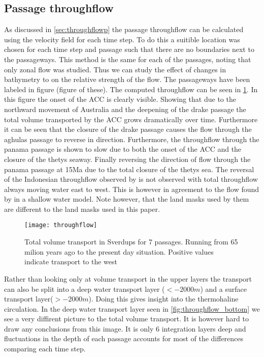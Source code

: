 \subsection{Passage throughflow} \label{sec:throughflow}
As discussed in \cref{sec:throughflowp} the passage throughflow can be calculated using the velocity field for each time step. To do this a suitible location was chosen for each time step and passage such that there are no boundaries next to the passageways. This method is the same for each of the passages, noting that only zonal flow was studied. Thus we can study the effect of changes in bathymetry to on the relative strength of the flow.  The passageways have been labeled in figure (figure of these). The computed throughflow can be seen in \cref{fig:throughflow}. In this figure the onset of the ACC is clearly visible. Showing that due to the northward movement of Australia and the deepening of the drake passage the total volume transported by the ACC grows dramatically over time. Furthermore it can be seen that the closure of the drake passage causes the flow through the aghulas passage to reverse in direction. Furthermore, the throughflow through the panama passage is shown to slow due to both the onset of the ACC and the closure of the thetys seaway. Finally reversing the direction of flow through the panama passage at 15Ma due to the total closure of the thetys sea. The reversal of the Indonesian throughflow observed by \cite{Mulder2017Jul} is not observed with total throughflow always moving water east to west. This is however in agreement to the flow found by \cite{omta2003physical} in a shallow water model. Note however, that the land masks used by them are different to the land masks used in this paper.

\begin{figure}[H]
	\texttt{[image: throughflow]}
	\caption{Total volume transport in Sverdups for 7 passages. Running from 65 milion years ago to the present day situation. Positive values indicate transport to the west}
	\label{fig:throughflow}
\end{figure}

Rather than looking only at volume transport in the upper layers the transport can also be split into a deep water transport layer ($<-2000m$) and a surface transport layer($>-2000m$). Doing this gives insight into the thermohaline circulation. In the deep water transport layer seen in \cref{fig:throughflow_bottom} we see a very diffirent picture to the total volume transport. It is however hard to draw any conclusions from this image. It is only 6 integration layers deep and fluctuations in the depth of each passage accounts for most of the differences comparing each time step.

